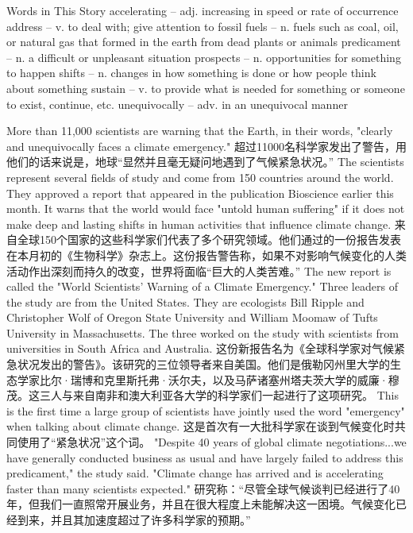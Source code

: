 \begin{messagebox}
Words in This Story
accelerating – adj. increasing in speed or rate of occurrence
address – v. to deal with; give attention to
fossil fuels – n. fuels such as coal, oil, or natural gas that formed in the earth from dead plants or animals
predicament – n. a difficult or unpleasant situation
prospects – n. opportunities for something to happen
shifts – n. changes in how something is done or how people think about something
sustain – v. to provide what is needed for something or someone to exist, continue, etc.
unequivocally – adv. in an unequivocal manner
\end{messagebox}

More than 11,000 scientists are warning that the Earth, in their words, "clearly and unequivocally faces a climate emergency."
超过11000名科学家发出了警告，用他们的话来说是，地球“显然并且毫无疑问地遇到了气候紧急状况。”
The scientists represent several fields of study and come from 150 countries around the world. They approved a report that appeared in the publication Bioscience earlier this month. It warns that the world would face "untold human suffering" if it does not make deep and lasting shifts in human activities that influence climate change.
来自全球150个国家的这些科学家们代表了多个研究领域。他们通过的一份报告发表在本月初的《生物科学》杂志上。这份报告警告称，如果不对影响气候变化的人类活动作出深刻而持久的改变，世界将面临“巨大的人类苦难。”
The new report is called the "World Scientists' Warning of a Climate Emergency." Three leaders of the study are from the United States. They are ecologists Bill Ripple and Christopher Wolf of Oregon State University and William Moomaw of Tufts University in Massachusetts. The three worked on the study with scientists from universities in South Africa and Australia.
这份新报告名为《全球科学家对气候紧急状况发出的警告》。该研究的三位领导者来自美国。他们是俄勒冈州里大学的生态学家比尔·瑞博和克里斯托弗·沃尔夫，以及马萨诸塞州塔夫茨大学的威廉·穆茂。这三人与来自南非和澳大利亚各大学的科学家们一起进行了这项研究。
This is the first time a large group of scientists have jointly used the word "emergency" when talking about climate change.
这是首次有一大批科学家在谈到气候变化时共同使用了“紧急状况”这个词。
"Despite 40 years of global climate negotiations...we have generally conducted business as usual and have largely failed to address this predicament," the study said. "Climate change has arrived and is accelerating faster than many scientists expected."
研究称：“尽管全球气候谈判已经进行了40年，但我们一直照常开展业务，并且在很大程度上未能解决这一困境。气候变化已经到来，并且其加速度超过了许多科学家的预期。”
